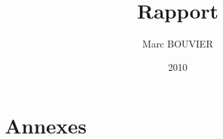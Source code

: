 \documentclass[12pt,oneside]{book}
\title{Rapport}
\author{Marc BOUVIER}
\date{2010}
\newcommand{\clearemptydoublepage}{%
	\newpage{\pagestyle{empty}\cleardoublepage}}
\begin{document}
	 
	\begin{frontmatter}
		\clearemptydoublepage
		\chapter*{}
		
		
		\tableofcontents{} %
		\listoffigures{}  %
	\end{frontmatter}
	\begin{mainmatter}
		
	\end{mainmatter}
	\part*{Annexes}
	\begin{appendix}
	
	
	
	\end{appendix}
	\clearemptydoublepage
	\begin{backmatter}
	
	\end{backmatter}
\end{document}
